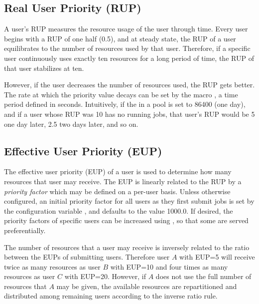 \subsection{\label{sec:RUP}Real User Priority (RUP)}
A user's RUP measures the resource usage of the user 
through time.
Every user begins with a RUP of one half (0.5), and
at steady state, the RUP of a user equilibrates to the number of resources 
used by that user.  Therefore, if a specific user continuously uses exactly 
ten resources for a long period of time, the RUP of that user stabilizes at 
ten.

However, if the user decreases the number of resources used, the RUP
gets better.  The rate at which the priority value decays 
can be set by the macro , a time period 
defined in seconds.   Intuitively, if the  in a pool 
is set to 86400 (one day), and if a user whose RUP was 10 has no
running jobs, 
that user's RUP would be 5 one day later, 2.5 two days later,
and so on.

\subsection{\label{sec:EUP}Effective User Priority (EUP)}
The effective user priority (EUP) of a user is used to determine
how many resources that user may receive.
The EUP is linearly related to the RUP
by a \emph{priority factor} which may be defined on a per-user basis.
Unless otherwise configured, 
an initial priority factor for all users as they first submit jobs
is set by the configuration variable ,
and defaults to the value 1000.0.
If desired, the priority factors of
specific users can be increased using ,
so that some are served preferentially.

The number of resources that a user may receive is inversely related
to the ratio between the EUPs of submitting users.
Therefore user $A$ with EUP=5 will receive
twice as many resources as user $B$ with EUP=10 and four times as many 
resources as user $C$ with EUP=20.
However, if $A$ does not use the full number
of resources that $A$ may be given,
the available resources are repartitioned and distributed among
remaining users according to the inverse ratio rule.

